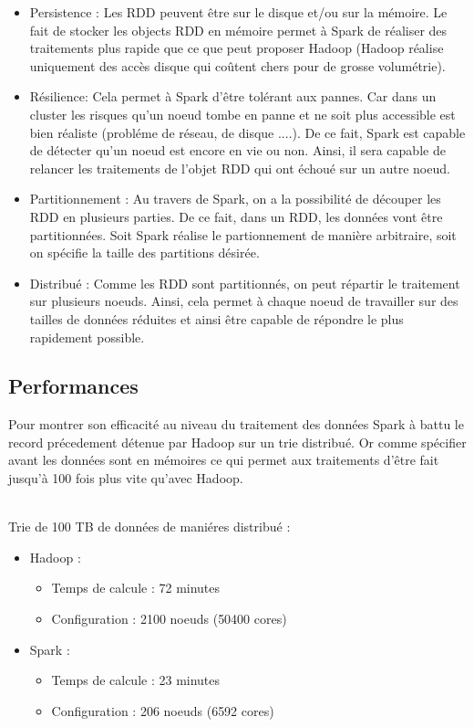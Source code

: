 \begin{itemize}
	\item Persistence : Les RDD peuvent être sur le disque et/ou sur la mémoire. Le fait de stocker les objects RDD en mémoire permet à Spark de réaliser des traitements plus rapide que ce que peut proposer Hadoop (Hadoop réalise uniquement des accès disque qui coûtent chers pour de grosse volumétrie).
	\item Résilience: Cela permet à Spark d'être tolérant aux pannes. Car dans un cluster les risques qu'un noeud tombe en panne et ne soit plus accessible est bien réaliste (probléme de réseau, de disque ....). De ce fait, Spark est capable de détecter qu'un noeud est encore en vie ou non. Ainsi, il sera capable de relancer les traitements de l'objet RDD qui ont échoué sur un autre noeud.
	\item Partitionnement : Au travers de Spark, on a la possibilité de découper les RDD en plusieurs parties. De ce fait, dans un RDD, les données vont être partitionnées. Soit Spark réalise le partionnement de manière arbitraire, soit on spécifie la taille des partitions désirée.
	\item Distribué : Comme les RDD sont partitionnés, on peut répartir le traitement sur plusieurs noeuds. Ainsi, cela permet à chaque noeud de travailler sur des tailles de données réduites et ainsi être capable de répondre le plus rapidement possible.
\end{itemize}

\subsection{Performances}

Pour montrer son efficacité au niveau du traitement des données Spark à battu le record précedement détenue par Hadoop sur un trie distribué. Or comme spécifier avant les données sont en mémoires ce qui permet aux traitements d'être fait jusqu'à 100 fois plus vite qu'avec Hadoop.

\ \\
Trie de 100 TB de données de maniéres distribué :
\ \\
\begin{itemize}
	\item Hadoop :
        \begin{itemize}
            \item Temps de calcule : 72 minutes
            \item Configuration : 2100 noeuds (50400 cores)
        \end{itemize}
	\item Spark :
		\begin{itemize}
        	\item Temps de calcule : 23 minutes
        	\item Configuration : 206 noeuds (6592 cores)
        \end{itemize}
\end{itemize}

